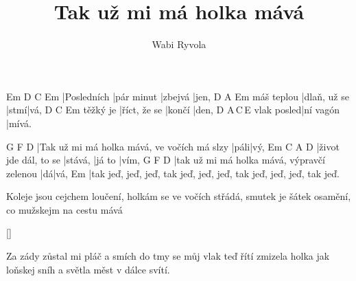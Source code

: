 \documentclass{song}
\author{Wabi Ryvola}
\title{Tak už mi má holka mává}
\begin{document}
\strophe
Em          D          C       Em
|Posledních |pár minut |zbejvá |jen,
           D            A    Em
máš teplou |dlaň, už se |stmí|vá,
         D            C      Em
těžký je |říct, že se |končí |den,
           D         A\,C\,E
vlak posled|ní vagón |mívá.
\endstrophe

G                                           F    D
|Tak už mi má holka mává, ve vočích má slzy |páli|vý,
Em                    C       A\7    D\7
|život jde dál, to se |stává, |já to |vím,
G                                          F  D
|tak už mi má holka mává, výpravčí zelenou |dá|vá,
Em
|tak jeď, jeď, jeď, tak jeď, jeď, jeď, tak jeď, jeď, jeď, tak jeď.
\endstrophe

\strophe*
Koleje jsou cejchem loučení,
holkám se ve vočích střádá,
smutek je šátek osamění,
co mužskejm na cestu mává
\endstrophe

\ref{}

\strophe*
Za zády zůstal mi pláč a smích
do tmy se můj vlak teď řítí
zmizela holka jak loňskej sníh
a světla měst v dálce svítí.
\endstrophe
\end{document}
